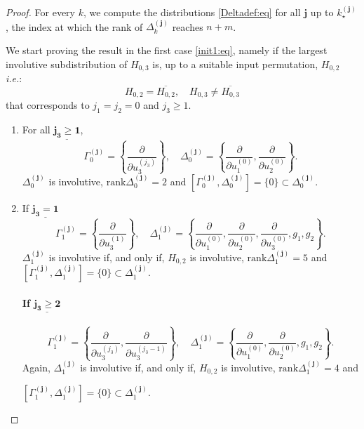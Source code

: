 \documentclass[10pt]{article}
\newcommand{\3}{\mathbf{3}}
\newcommand{\2}{\mathbf{2}}
\newcommand{\1}{\mathbf{1}}
\newcommand{\0}{\mathbf{0}}
\newcommand{\ie}{\textsl{i.e.}}
\newcommand{\mbf}[1]{\mathbf{#1}}
\newcommand{\rk}{\mathrm{rank}}
\newcommand{\ddu}[2]{\frac{\partial}{\partial u_{#1}^{(#2)}}}
\newcommand{\ol}[1]{\overline{#1}}
\begin{document}
\begin{proof}
For every $k$, we compute the distributions \eqref{Deltadef:eq} for all $\mbf{j}$ up to $k_{\star}^{(\mbf{j})}$, the index at which the rank of $\Delta_{k}^{(\mbf{j})}$ reaches $n+m$.

We start proving the result in the first case \eqref{init1:eq}, namely if the largest involutive subdistribution of $H_{0,3}$ is, up to a suitable input permutation, $H_{0,2}$  \ie:
$$
H_{0,2} = \ol{H_{0,2}}, \quad H_{0,3} \neq \ol{H_{0,3}}
$$
that corresponds to $j_{1} = j_{2}=0$ and $j_3 \geq 1$.

\begin{enumerate}
\item[\framebox{\Large{$\mathbf{k=0}$}}]
For all $\underline{\mathbf{j_{3}\geq 1}}$,
$$\Gamma_{0}^{(\mbf{j})} = \left\{\ddu{3}{j_{3}}\right\}, \quad \Delta_{0}^{(\mbf{j})} = \left\{\ddu{1}{0}, \ddu{2}{0}\right\}.$$
$\Delta_{0}^{(\mbf{j})}$ is involutive, $\rk \Delta_{0}^{(\mbf{j})}= 2$ and $[\Gamma_{0}^{(\mbf{j})}, \Delta_{0}^{(\mbf{j})}] = \{ 0 \} \subset \Delta_{0}^{(\mbf{j})}$.













\item[\framebox{\Large{$\mathbf{k=1}$}}]

If $\underline{\mathbf{j_{3} = 1}}$
$$\Gamma_{1}^{(\mbf{j})} = \left\{\ddu{3}{1} \right\}, \quad \Delta_{1}^{(\mbf{j})} = \left\{\ddu{1}{0}, \ddu{2}{0}, \ddu{3}{0}, g_{1}, g_{2} \right\}.$$
$\Delta_{1}^{(\mbf{j})}$ is involutive if, and only if, $H_{0,2}$ is involutive, $\rk \Delta_{1}^{(\mbf{j})}= 5$ and $[\Gamma_{1}^{(\mbf{j})}, \Delta_{1}^{(\mbf{j})}] = \{ 0 \} \subset \Delta_{1}^{(\mbf{j})}$.
\paragraph{If $\underline{\mathbf{ j_{3} \geq 2}}$}
$$\Gamma_{1}^{(\mbf{j})} = \left\{\ddu{3}{j_{3}}, \ddu{3}{j_{3}-1} \right\}, \quad \Delta_{1}^{(\mbf{j})} = \left\{\ddu{1}{0}, \ddu{2}{0},  g_{1}, g_{2} \right\}.$$
Again, $\Delta_{1}^{(\mbf{j})}$ is involutive if, and only if, $H_{0,2}$ is involutive, $\rk \Delta_{1}^{(\mbf{j})}= 4$ and



$[\Gamma_{1}^{(\mbf{j})}, \Delta_{1}^{(\mbf{j})}] = \{ 0 \} \subset \Delta_{1}^{(\mbf{j})}$.


\end{enumerate}
\end{proof}
\end{document}

